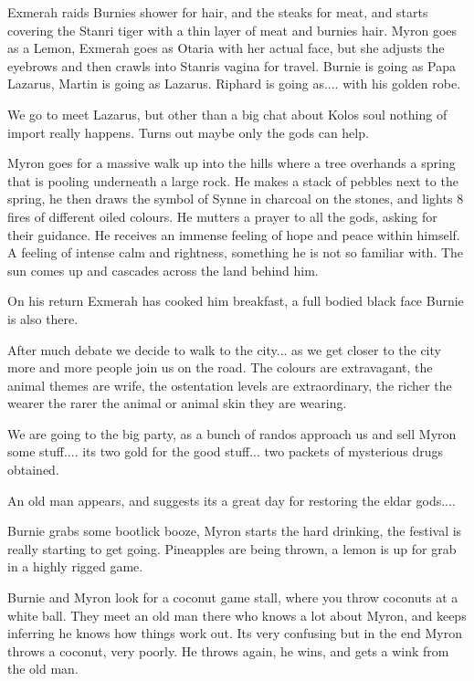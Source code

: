 Exmerah raids Burnies shower for hair, and the steaks for meat, and starts covering the Stanri tiger with a thin layer of meat and burnies hair. Myron goes as a Lemon, Exmerah goes as Otaria with her actual face, but she adjusts the eyebrows and then crawls into Stanris vagina for travel. Burnie is going as Papa Lazarus, Martin is going as Lazarus. Riphard is going as.... with his golden robe.\medskip

We go to meet Lazarus, but other than a big chat about Kolos soul nothing of import really happens. Turns out maybe only the gods can help.\medskip

Myron goes for a massive walk up into the hills where a tree overhands a spring that is pooling underneath a large rock. He makes a stack of pebbles next to the spring, he then draws the symbol of Synne in charcoal on the stones, and lights 8 fires of different oiled colours. He mutters a prayer to all the gods, asking for their guidance. He receives an immense feeling of hope and peace within himself. A feeling of intense calm and rightness, something he is not so familiar with. The sun comes up and cascades across the land behind him.\medskip

On his return Exmerah has cooked him breakfast, a full bodied black face Burnie is also there.\medskip

After much debate we decide to walk to the city... as we get closer to the city more and more people join us on the road. The colours are extravagant, the animal themes are wrife, the ostentation levels are extraordinary, the richer the wearer the rarer the animal or animal skin they are wearing.\medskip

We are going to the big party, as a bunch of randos approach us and sell Myron some stuff.... its two gold for the good stuff... two packets of mysterious drugs obtained.\medskip

An old man appears, and suggests its a great day for restoring the eldar gods....\medskip

Burnie grabs some bootlick booze, Myron starts the hard drinking, the festival is really starting to get going. Pineapples are being thrown, a lemon is up for grab in a highly rigged game.\medskip

Burnie and Myron look for a coconut game stall, where you throw coconuts at a white ball. They meet an old man there who knows a lot about Myron, and keeps inferring he knows how things work out. Its very confusing but in the end Myron throws a coconut, very poorly. He throws again, he wins, and gets a wink from the old man.\medskip

